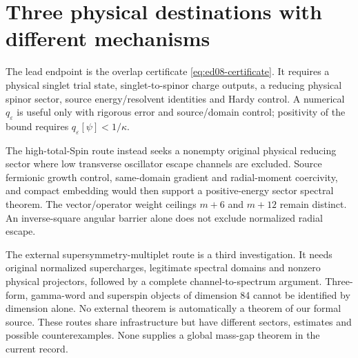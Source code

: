 
\section{Three physical destinations with different mechanisms}
\label{sec:ed08-spectral-routes}
The lead endpoint is the overlap certificate
\eqref{eq:ed08-certificate}. It requires a physical singlet trial
state, singlet-to-spinor charge outputs, a reducing physical spinor
sector, source energy/resolvent identities and Hardy control.
A numerical $q_\varepsilon$ is useful only with rigorous error and
source/domain control; positivity of the bound requires
$q_\varepsilon[\psi]<1/\kappa$.

The high-total-Spin route instead seeks a nonempty original physical
reducing sector where low transverse oscillator escape channels are
excluded. Source fermionic growth control, same-domain gradient and
radial-moment coercivity, and compact embedding would then support
a positive-energy sector spectral theorem. The vector/operator
weight ceilings $m+6$ and $m+12$ remain distinct. An inverse-square
angular barrier alone does not exclude normalized radial escape.

The external supersymmetry-multiplet route is a third investigation.
It needs original normalized supercharges, legitimate spectral
domains and nonzero physical projectors, followed by a complete
channel-to-spectrum argument. Three-form, gamma-word and superspin
objects of dimension 84 cannot be identified by dimension alone.
No external theorem is automatically a theorem of our formal source.
These routes share infrastructure but have different sectors,
estimates and possible counterexamples. None supplies a global
mass-gap theorem in the current record.
